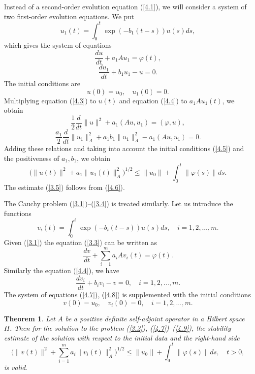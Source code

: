 \documentclass[3p]{elsarticle}
\newtheorem{thm}{Theorem}
\numberwithin{equation}{section}
\begin{document}
Instead of a second-order evolution equation (\ref{4.1}), we will consider a system of two first-order evolution equations.
We put
\[
 u_1(t) = \int_{0}^{t} \exp(-b_1 (t-s)) u(s) d s ,
\] 
which gives the system of equations
\begin{equation}\label{4.3}
 \frac{d u}{d t} + a_1 A u_1 = \varphi (t) , 
\end{equation} 
\begin{equation}\label{4.4}
 \frac{d u_1}{d t} + b_1 u_1 - u = 0 .
\end{equation} 
The initial conditions are
\begin{equation}\label{4.5}
 u(0) = u_0,
 \quad u_1(0) = 0 . 
\end{equation} 
Multiplying equation (\ref{4.3}) to $u(t)$ and equation (\ref{4.4}) to $a_1 A u_1 (t)$, we obtain
\[
 \frac{1}{2}  \frac{d}{d t} \|u\|^2 + a_1 (A u,u_1) = (\varphi, u),
\] 
\[
 \frac{a_1}{2} \frac{d}{d t} \|u_1\|_{A}^2 + a_1 b_1  \|u_1\|_{A}^2 - a_1 (A u,u_1) = 0 .
\] 
Adding these relations and taking into account the initial conditions (\ref{4.5}) and the positiveness of $a_1, b_1$, we obtain
\begin{equation}\label{4.6}
 \Big (\|u(t)\|^2 + a_1 \|u_1(t)\|_{A}^2 \Big)^{1/2} \leq \|u_0\| +  \int_{0}^{t} \|\varphi(s)\| d s .
\end{equation} 
The estimate (\ref{3.5}) follows from (\ref{4.6}).

The Cauchy problem (\ref{3.1})--(\ref{3.4}) is treated similarly.
Let us introduce the functions
\[
 v_i(t) = \int_{0}^{t} \exp(-b_i (t-s)) u(s) d s ,
 \quad i = 1,2, \ldots, m . 
\] 
Given (\ref{3.1}) the equation (\ref{3.3}) can be written as
\begin{equation}\label{4.7}
 \frac{d v}{d t} + \sum_{i=1}^{m} a_i A v_i(t) = \varphi (t) .
\end{equation} 
Similarly the equation (\ref{4.4}), we have
\begin{equation}\label{4.8}
 \frac{d v_i}{d t} + b_i v_i - v = 0 ,
 \quad i = 1,2, \ldots, m . 
\end{equation} 
The system of equations (\ref{4.7}), (\ref{4.8}) is supplemented with the initial conditions
\begin{equation}\label{4.9}
 v(0) = u_0,
 \quad v_i(0) = 0,
 \quad i = 1,2, \ldots, m .  
\end{equation} 

\begin{thm}\label{t-3}
Let $A$  be a positive definite self-adjoint operator in a Hilbert space $H$. 
Then for the solution to the problem (\ref{3.2}), (\ref{4.7})--(\ref{4.9}), the stability estimate of the solution with respect to the initial data and the right-hand side 
\begin{equation}\label{4.10}
 \Big (\|v(t)\|^2 + \sum_{i=1}^{m} a_i \|v_i(t)\|_{A}^2 \Big)^{1/2} \leq \|u_0\| +  \int_{0}^{t} \|\varphi(s)\| d s ,
 \quad t > 0 , 
\end{equation} 
is valid.
\end{thm}
\end{document}
